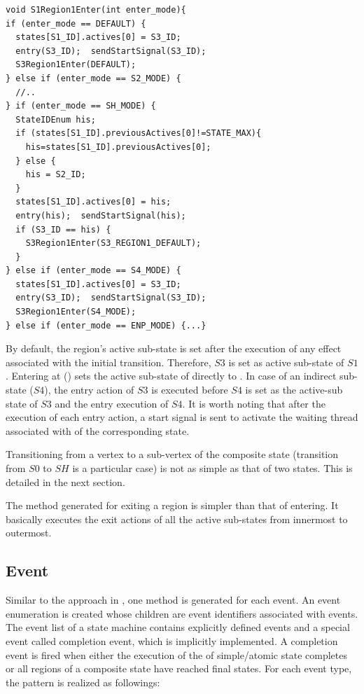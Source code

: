   
\begin{lstlisting}[caption=Example code generated for the region of S1, label=lst:region,float]
void S1Region1Enter(int enter_mode){
if (enter_mode == DEFAULT) {
  states[S1_ID].actives[0] = S3_ID;
  entry(S3_ID);  sendStartSignal(S3_ID);
  S3Region1Enter(DEFAULT);
} else if (enter_mode == S2_MODE) { 
  //..
} if (enter_mode == SH_MODE) {
  StateIDEnum his;
  if (states[S1_ID].previousActives[0]!=STATE_MAX){
    his=states[S1_ID].previousActives[0];
  } else {
    his = S2_ID;
  }
  states[S1_ID].actives[0] = his;
  entry(his);  sendStartSignal(his);
  if (S3_ID == his) {
    S3Region1Enter(S3_REGION1_DEFAULT);
  } 
} else if (enter_mode == S4_MODE) {
  states[S1_ID].actives[0] = S3_ID;
  entry(S3_ID);  sendStartSignal(S3_ID);
  S3Region1Enter(S4_MODE);
} else if (enter_mode == ENP_MODE) {...}
\end{lstlisting}




By default, the region's active sub-state is set after the execution of any effect associated with the initial transition. 
Therefore, $S3$ is set as active sub-state of $S1$. 
Entering at () sets the active sub-state of  directly to . 
In case of an indirect sub-state ($S4$), the entry action of $S3$ is executed before $S4$ is set as the active-sub state of $S3$ and the entry execution of $S4$. 
It is worth noting that after the execution of each entry action, a start signal is sent to activate the waiting thread associated with  of the corresponding state.

Transitioning from a vertex to a sub-vertex of the composite state (transition from $S0$ to $SH$ is a particular case) is not as simple as that of two states. This is detailed in the next section.


The method generated for exiting a region is simpler than that of entering.
It basically executes the exit actions of all the active sub-states from innermost to outermost.
\subsection{Event}
\label{subsec:event}
Similar to the approach in \cite{niaz_mapping_2004}, one method is generated for each event. 
An event enumeration  is created whose children are event identifiers associated with events. 
The event list of a state machine contains explicitly defined events and a special event called completion event, which is implicitly implemented. 
A completion event is fired when either the execution of the  of simple/atomic state completes or all regions of a composite state have reached final states. 
For each event type, the pattern is realized as followings:


